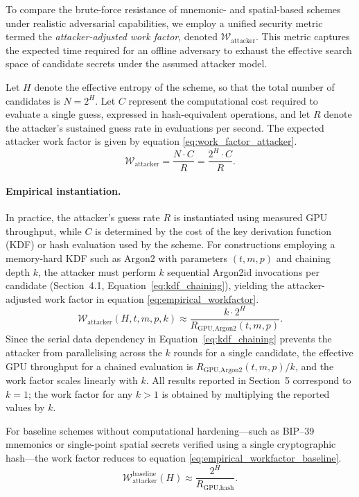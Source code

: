 \documentclass[journal,article,accept,pdftex,moreauthors]{Definitions/mdpi}
\begin{document}
To compare the brute-force resistance of mnemonic- and spatial-based schemes under realistic adversarial capabilities, we employ a unified security metric termed the \emph{attacker-adjusted work factor}, denoted $\mathcal{W}_{\text{attacker}}$. This metric captures the expected time required for an offline adversary to exhaust the effective search space of candidate secrets under the assumed attacker model.

Let $H$ denote the effective entropy of the scheme, so that the total number of candidates is $N = 2^{H}$. Let $C$ represent the computational cost required to evaluate a single guess, expressed in hash-equivalent operations, and let $R$ denote the attacker’s sustained guess rate in evaluations per second. The expected attacker work factor is given by equation \ref{eq:work_factor_attacker}.
\begin{equation}
\mathcal{W}_{\text{attacker}} = \frac{N \cdot C}{R} = \frac{2^{H} \cdot C}{R}.
\label{eq:work_factor_attacker}
\end{equation}

\paragraph{Empirical instantiation.}
In practice, the attacker’s guess rate $R$ is instantiated using measured GPU throughput, while $C$ is determined by the cost of the key derivation function (KDF) or hash evaluation used by the scheme. For constructions employing a memory-hard KDF such as Argon2 with parameters $(t, m, p)$ and chaining depth $k$, the attacker must perform $k$ sequential Argon2id invocations per candidate (Section~4.1, Equation~\ref{eq:kdf_chaining}), yielding the attacker-adjusted work factor in equation \ref{eq:empirical_workfactor}.
\begin{equation}
\mathcal{W}_{\text{attacker}}(H, t, m, p, k) \approx \frac{k \cdot 2^{H}}{R_{\text{GPU,Argon2}}(t, m, p)}.
\label{eq:empirical_workfactor}
\end{equation}
Since the serial data dependency in Equation~\ref{eq:kdf_chaining} prevents the attacker from parallelising across the $k$ rounds for a single candidate, the effective GPU throughput for a chained evaluation is $R_{\text{GPU,Argon2}}(t,m,p)/k$, and the work factor scales linearly with $k$. All results reported in Section~5 correspond to $k=1$; the work factor for any $k > 1$ is obtained by multiplying the reported values by $k$.

For baseline schemes without computational hardening—such as BIP--39 mnemonics or single-point spatial secrets verified using a single cryptographic hash—the work factor reduces to equation \ref{eq:empirical_workfactor_baseline}.
\begin{equation}
\mathcal{W}_{\text{attacker}}^{\text{baseline}}(H) \approx \frac{2^{H}}{R_{\text{GPU,hash}}}.
\label{eq:empirical_workfactor_baseline}
\end{equation}
\end{document}
